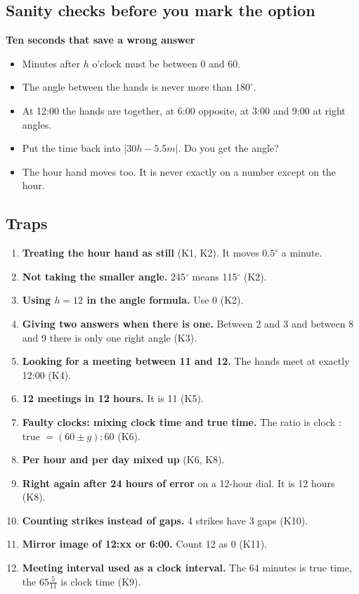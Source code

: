 \documentclass[11pt,a4paper]{article}
\let\oldsubsection\subsection
\renewcommand{\subsection}{\needspace{9\baselineskip}\oldsubsection}
\newcommand{\infobox}[2]{\par\medskip\noindent\begingroup\setlength{\fboxsep}{7pt}%
  \colorbox{codebg}{\parbox{\dimexpr\linewidth-14pt\relax}{\textbf{\color{ember}#1}\par\smallskip #2}}\endgroup\par\medskip}
\begin{document}
\subsection*{Sanity checks before you mark the option}
\infobox{Ten seconds that save a wrong answer}{
\begin{itemize}
\item Minutes after $h$ o'clock must be between 0 and 60.
\item The angle between the hands is never more than $180^\circ$.
\item At 12:00 the hands are together, at 6:00 opposite, at 3:00 and 9:00 at right angles.
\item Put the time back into $|30h - 5.5m|$. Do you get the angle?
\item The hour hand moves too. It is never exactly on a number except on the hour.
\end{itemize}}

\subsection*{Traps}
\begin{enumerate}
\item \textbf{Treating the hour hand as still} (K1, K2). It moves $0.5^\circ$ a minute.
\item \textbf{Not taking the smaller angle.} 245$^\circ$ means 115$^\circ$ (K2).
\item \textbf{Using $h = 12$ in the angle formula.} Use 0 (K2).
\item \textbf{Giving two answers when there is one.} Between 2 and 3 and between 8 and 9 there is only one right angle (K3).
\item \textbf{Looking for a meeting between 11 and 12.} The hands meet at exactly 12:00 (K4).
\item \textbf{12 meetings in 12 hours.} It is 11 (K5).
\item \textbf{Faulty clocks: mixing clock time and true time.} The ratio is clock : true $=(60 \pm g) : 60$ (K6).
\item \textbf{Per hour and per day mixed up} (K6, K8).
\item \textbf{Right again after 24 hours of error} on a 12-hour dial. It is 12 hours (K8).
\item \textbf{Counting strikes instead of gaps.} 4 strikes have 3 gaps (K10).
\item \textbf{Mirror image of 12:xx or 6:00.} Count 12 as 0 (K11).
\item \textbf{Meeting interval used as a clock interval.} The 64 minutes is true time, the $65\frac5{11}$ is clock time (K9).
\end{enumerate}
\end{document}
